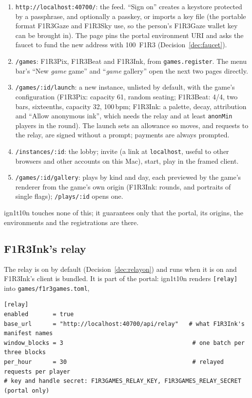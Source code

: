 \documentclass[11pt]{article}
\theoremstyle{definition}
\theoremstyle{remark}
\newcommand{\code}[1]{\texttt{#1}}
\newcommand{\Gz}{F1R3Gaze}
\newcommand{\Hr}{ign1t10n}
\begin{document}
\begin{enumerate}[nosep]
\item \code{http://localhost:40700/}: the feed. ``Sign on'' creates a keystore
  protected by a passphrase, and optionally a passkey, or imports a key file (the
  portable format \Gz{} and F1R3Sky use, so the person's \Gz{} wallet key can be
  brought in). The page pins the portal environment URI and asks the faucet to fund
  the new address with 100~F1R3 (Decision~\ref{dec:faucet}).
\item \code{/games}: F1R3Pix, F1R3Beat and F1R3Ink, from \code{games.register}. The
  menu bar's ``New \textit{game} game'' and ``\textit{game} gallery'' open the next two
  pages directly.
\item \code{/games/:id/launch}: a new instance, unlisted by default, with the game's
  configuration (F1R3Pix: capacity 61, random seating; F1R3Beat: 4/4, two bars,
  sixteenths, capacity 32, 100\,bpm; F1R3Ink: a palette, decay, attribution and
  ``Allow anonymous ink'', which needs the relay and at least \code{anonMin} players
  in the round). The launch sets an allowance so moves, and requests to the relay, are
  signed without a prompt; payments are always prompted.
\item \code{/instances/:id}: the lobby; invite (a link at \code{localhost}, useful to
  other browsers and other accounts on this Mac), start, play in the framed client.
\item \code{/games/:id/gallery}: plays by kind and day, each previewed by the game's
  renderer from the game's own origin (F1R3Ink: rounds, and portraits of single
  flags); \code{/plays/:id} opens one.
\end{enumerate}

\noindent
\Hr{} touches none of this; it guarantees only that the portal, its origins, the
environments and the registrations are there.

\subsection{F1R3Ink's relay}\label{sec:relay}

The relay is on by default (Decision~\ref{dec:relayon}) and runs when it is on and
F1R3Ink's client is bundled. It is part of the portal: \Hr{} renders
\code{[relay]} into \code{games/f1r3games.toml},

\begin{lstlisting}[language=Conf]
[relay]
enabled       = true
base_url      = "http://localhost:40700/api/relay"   # what F1R3Ink's manifest names
window_blocks = 3                                     # one batch per three blocks
per_hour      = 30                                    # relayed requests per player
# key and handle secret: F1R3GAMES_RELAY_KEY, F1R3GAMES_RELAY_SECRET (portal only)
\end{lstlisting}
\end{document}
